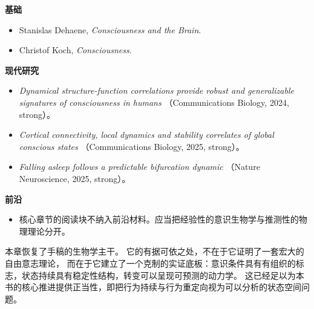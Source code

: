 \begin{readingbox}
\textbf{基础}
\begin{itemize}[nosep]
  \item Stanislas Dehaene, \emph{Consciousness and the Brain}.
  \item Christof Koch, \emph{Consciousness}.
\end{itemize}
\textbf{现代研究}
\begin{itemize}[nosep]
  \item \emph{Dynamical structure-function correlations provide robust and
        generalizable signatures of consciousness in humans}
        （Communications Biology, 2024, strong）。
  \item \emph{Cortical connectivity, local dynamics and stability correlates of
        global conscious states} （Communications Biology, 2025, strong）。
  \item \emph{Falling asleep follows a predictable bifurcation dynamic}
        （Nature Neuroscience, 2025, strong）。
\end{itemize}
\textbf{前沿}
\begin{itemize}[nosep]
  \item 核心章节的阅读块不纳入前沿材料。应当把经验性的意识生物学与推测性的物理理论分开。
\end{itemize}
\end{readingbox}

\begin{summarybox}
本章恢复了手稿的生物学主干。
它的有据可依之处，不在于它证明了一套宏大的自由意志理论，
而在于它建立了一个克制的实证底板：意识条件具有有组织的标志，状态持续具有稳定性结构，转变可以呈现可预测的动力学。
这已经足以为本书的核心推进提供正当性，即把行为持续与行为重定向视为可以分析的状态空间问题。
\end{summarybox}